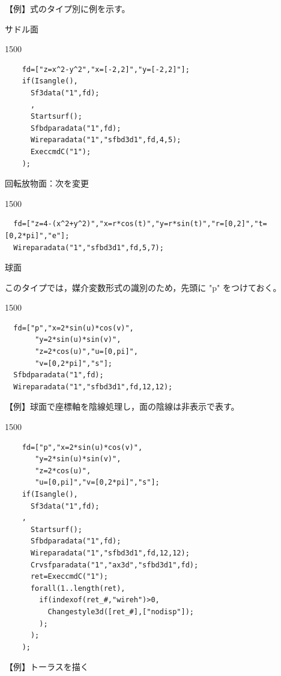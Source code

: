 \documentclass[papersize,a4paper,12pt,uplatex]{jsarticle}
\begin{document}
\begin{description}
\vspace{\baselineskip} 
【例】式のタイプ別に例を示す。

\vspace{\baselineskip}
サドル面

\begin{layer}{150}{0}
\end{layer}
\begin{verbatim}
    fd=["z=x^2-y^2","x=[-2,2]","y=[-2,2]"];
    if(Isangle(),
      Sf3data("1",fd);
      ,
      Startsurf();
      Sfbdparadata("1",fd);
      Wireparadata("1","sfbd3d1",fd,4,5);
      ExeccmdC("1");
    );
\end{verbatim}

回転放物面：次を変更

\begin{layer}{150}{0}
\end{layer}
\begin{verbatim}
  fd=["z=4-(x^2+y^2)","x=r*cos(t)","y=r*sin(t)","r=[0,2]","t=[0,2*pi]","e"];
  Wireparadata("1","sfbd3d1",fd,5,7);
\end{verbatim}
\vspace{25mm}

球面

このタイプでは，媒介変数形式の識別のため，先頭に "p" をつけておく。

\begin{layer}{150}{0}
\end{layer}
\begin{verbatim}
  fd=["p","x=2*sin(u)*cos(v)",
       "y=2*sin(u)*sin(v)",
       "z=2*cos(u)","u=[0,pi]",
       "v=[0,2*pi]","s"];
  Sfbdparadata("1",fd);
  Wireparadata("1","sfbd3d1",fd,12,12); 
\end{verbatim}

\vspace{8mm}

\vspace{\baselineskip}
【例】球面で座標軸を陰線処理し，面の陰線は非表示で表す。

\begin{layer}{150}{0}
\end{layer}

\begin{verbatim}
    fd=["p","x=2*sin(u)*cos(v)",
       "y=2*sin(u)*sin(v)",
       "z=2*cos(u)",
       "u=[0,pi]","v=[0,2*pi]","s"];
    if(Isangle(),
      Sf3data("1",fd);
    ,
      Startsurf();
      Sfbdparadata("1",fd);
      Wireparadata("1","sfbd3d1",fd,12,12);
      Crvsfparadata("1","ax3d","sfbd3d1",fd);
      ret=ExeccmdC("1");
      forall(1..length(ret),
        if(indexof(ret_#,"wireh")>0,
          Changestyle3d([ret_#],["nodisp"]);
        );
      );
    );
\end{verbatim}
【例】トーラスを描く


\end{description}
\end{document}
